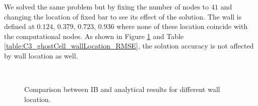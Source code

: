 We solved the same problem but by fixing the number of nodes to $41$ and changing the location of fixed bar to see its effect of the solution. The wall is defined at $0.124$, $0.379$, $0.723$, $0.936$ where none of these location coincide with the computational nodes. As shown in Figure \ref{fig:C3_ghostCell_wallLocation} and Table \ref{table:C3_ghostCell_wallLocation_RMSE}, the solution accuracy is not affected by wall location as well.

\begin{figure}[H]
	\centering
	\quad
	\\
	\quad
	\caption{Comparison between IB and analytical results for different wall location.}
	\label{fig:C3_ghostCell_wallLocation}
\end{figure}

